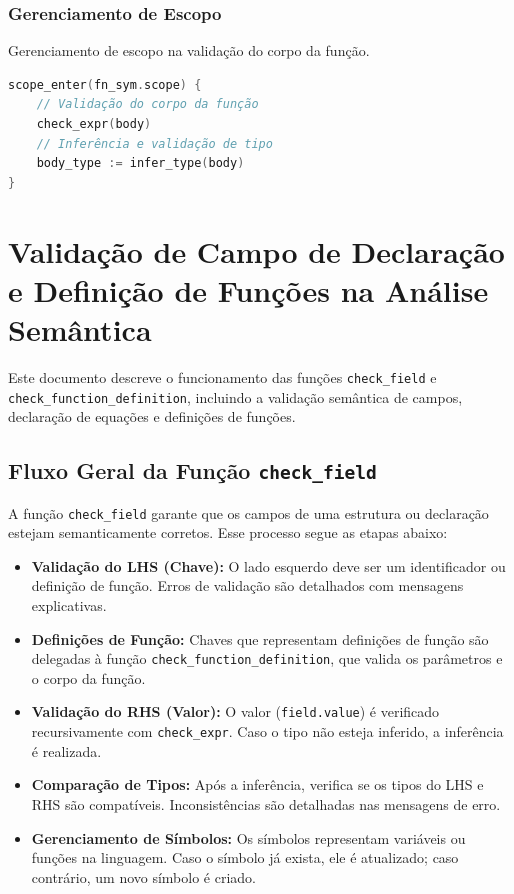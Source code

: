\subsubsection{Gerenciamento de Escopo}
\begin{codigo}[htb]
    \caption{\small Gerenciamento de escopo na validação do corpo da função.}
    \label{cod-scope-management}
\begin{lstlisting}[language=C, numbers=none, frame=none, inputencoding=latin1]
scope_enter(fn_sym.scope) {
    // Validação do corpo da função
    check_expr(body)
    // Inferência e validação de tipo
    body_type := infer_type(body)
}
\end{lstlisting}
\end{codigo}
\section*{Validação de Campo de Declaração e Definição de Funções na Análise Semântica}

Este documento descreve o funcionamento das funções \texttt{check\_field} e \texttt{check\_function\_definition}, incluindo a validação semântica de campos, declaração de equações e definições de funções. 

\subsection*{Fluxo Geral da Função \texttt{check\_field}}

A função \texttt{check\_field} garante que os campos de uma estrutura ou declaração estejam semanticamente corretos. Esse processo segue as etapas abaixo:

\begin{itemize}
  \item \textbf{Validação do LHS (Chave):}  
  O lado esquerdo deve ser um identificador ou definição de função. Erros de validação são detalhados com mensagens explicativas.

  \item \textbf{Definições de Função:}  
  Chaves que representam definições de função são delegadas à função \texttt{check\_function\_definition}, que valida os parâmetros e o corpo da função.

  \item \textbf{Validação do RHS (Valor):}  
  O valor (\texttt{field.value}) é verificado recursivamente com \texttt{check\_expr}. Caso o tipo não esteja inferido, a inferência é realizada.

  \item \textbf{Comparação de Tipos:}  
  Após a inferência, verifica se os tipos do LHS e RHS são compatíveis. Inconsistências são detalhadas nas mensagens de erro.

  \item \textbf{Gerenciamento de Símbolos:}  
  Os símbolos representam variáveis ou funções na linguagem. Caso o símbolo já exista, ele é atualizado; caso contrário, um novo símbolo é criado.
\end{itemize}

